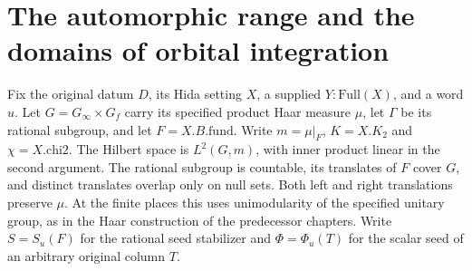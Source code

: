 \section{The automorphic range and the domains of orbital integration}
\label{sec:period-range-v59}
Fix the original datum \(D\), its Hida setting \(X\), a supplied
\(Y:\mathrm{Full}(X)\), and a word \(u\). Let
\(G=G_\infty\times G_f\) carry its specified product Haar measure
\(\mu\), let \(\Gamma\) be its rational subgroup, and let
\(F=X.B.\mathrm{fund}\). Write \(m=\mu|_F\), \(K=X.K_2\) and
\(\chi=X.\mathrm{chi2}\). The Hilbert space is
\(L^2(G,m)\), with inner product linear in the second argument.
The rational subgroup is countable, its translates of \(F\) cover
\(G\), and distinct translates overlap only on null sets. Both
left and right translations preserve \(\mu\). At the finite places
this uses unimodularity of the specified unitary group, as in the
Haar construction of the predecessor chapters. Write \(S=S_u(F)\)
for the rational seed stabilizer and \(\Phi=\Phi_u(T)\) for the
scalar seed of an arbitrary original column \(T\).

